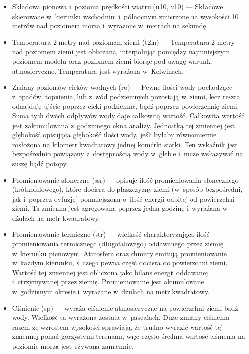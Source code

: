 \begin{itemize}
    \item Składowa pionowa i~pozioma prędkości wiatru (u10, v10) — 
    Składowe skierowane w~kierunku wschodnim i~północnym zmierzone na wysokości 10 metrów nad poziomem
    morza i~wyrażone w~metrach na sekundę.

    \item Temperatura 2 metry nad poziomem ziemi (t2m) — Temperatura 2 metry nad poziomem ziemi jest
    obliczana, interpolując pomiędzy najmniejszym poziomem modelu oraz poziomem ziemi biorąc pod
    uwagę warunki atmosferyczne. Temperatura jest wyrażona w~Kelwinach.

    \item Zmiany poziomów cieków wodnych (ro) — 
    Pewne ilości wody pochodzące z~opadów, topnienia, lub z~wód podziemnych pozostają w~ziemi, lecz reszta
    odnajduję ujście poprzez cieki podziemne, bądź poprzez powierzchnię ziemi. Suma tych dwóch
    odpływów wody daje całkowitą wartość. Całkowita wartość jest zakumulowana z~godzinnego
    okna analizy. Jednostką tej zmiennej jest głębokość opisująca głębokość ilości wody, jeśli byłaby
    równomiernie rozłożona na kilometr kwadratowy jednej komórki siatki. Ten wskaźnik jest
    bezpośrednio powiązany z~dostępnością wody w~glebie i~może wskazywać na suszę bądź potopy.

    \item Promieniowanie słoneczne (ssr) — opisuje ilość promieniowania słonecznego (krótkofalowego), które dociera do 
    płaszczyzny ziemi (w~sposób bezpośredni, jak i~poprzez dyfuzję) pomniejszoną o~ilość energii
    odbitej od powierzchni ziemi. Ta zmienna jest agregowana poprzez jedną godzinę i~wyrażana w~
    dżulach na metr kwadratowy.

    \item Promieniowanie termiczne (str) — wielkość charakteryzująca ilość promieniowania termicznego
    (długofalowego) oddawanego przez ziemię w~kierunku pionowym. Atmosfera oraz chmury emitują 
    promieniowanie w~każdym kierunku, z~czego pewna część dociera do powierzchni ziemi. Wartość
    tej zmiennej jest obliczona jako bilans energii oddawanej i~otrzymywanej przez ziemię. 
    Promieniowanie jest akumulowane w~godzinnym okresie i~wyrażane w~dżulach na metr kwadratowy.

    \item Ciśnienie (sp) — wyraża ciśnienie atmosferyczne na powierzchni ziemi bądź wody. Wielkość
    ta wyrażona została w~pascalach. Duże zmiany ciśnienia razem ze wzrostem wysokości sprawiają,
    że trudno wyrazić wartość tej zmiennej ponad górzystymi terenami, więc często średnia wartość
    ciśnienia na poziomie morza jest używana zamiennie.


\end{itemize}
